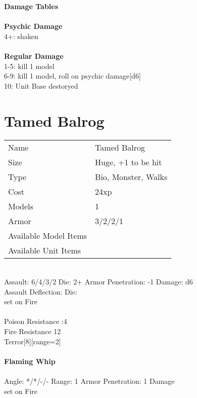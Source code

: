 {\bf Damage Tables} \\
\ \\ {\bf Psychic Damage } \\
4+: shaken \\
\ \\ {\bf Regular Damage } \\
1-5: kill 1 model \\
6-9: kill 1 model, roll on psychic damage[d6] \\
10: Unit Base destoryed \\









\pagebreak

\section{ Tamed Balrog }

\begin{tabular}{ll}
  Name & Tamed Balrog \\
  Size & Huge, +1 to be hit\\
  Type & Bio, Monster, Walks\\
  Cost & 24xp\\
  Models & 1\\
  Armor & 3/2/2/1\\
  Available Model Items &  \\
  Available Unit Items &  \\
\end{tabular}

\ \\
Assault: 6/4/3/2 Die: 2+ Armor Penetration: -1 Damage: d6 \\
Assault Deflection:  Die: \\
\indent set on Fire \\
\ \\
Poison Resistance :4 \\ Fire Resistance 12 \\ Terror[8][range=2]
\ \\
\ \\
{\bf Flaming Whip } \\
\ \\
Angle: */*/-/- Range: 1 Armor Penetration: 1 Damage  \\
\indent set on Fire \\





